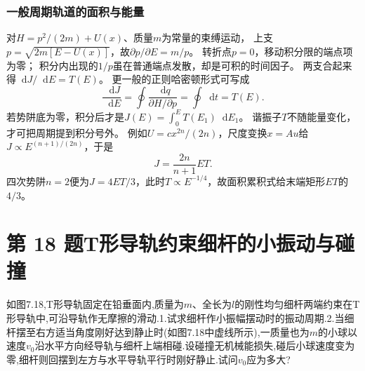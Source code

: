\documentclass[UTF8,fontset=fandol,a4paper,11pt]{ctexart}
\newcommand{\dd}{\mathop{}\!\mathrm{d}}
\newcommand{\tagline}[1]{\noindent{\small\color{muted}#1}\par}
\newcommand{\figcaption}[1]{\par\vspace{2pt}{\small\color{muted}#1}\par}
\begin{document}
\subsubsection*{一般周期轨道的面积与能量}
对$H=p^2/(2m)+U(x)$、质量$m$为常量的束缚运动，
上支$p=\sqrt{2m[E-U(x)]}$，故$\partial p/\partial E=m/p$。
转折点$p=0$，移动积分限的端点项为零；
积分内出现的$1/p$虽在普通端点发散，却是可积的时间因子。
两支合起来得$\dd J/\dd E=T(E)$。
更一般的正则哈密顿形式可写成
\[
\frac{\dd J}{\dd E}=\oint\frac{\dd q}{\partial H/\partial p}
=\oint\dd t=T(E).
\]
若势阱底为零，积分后才是$J(E)=\int_0^E T(E_1)\dd E_1$。
谐振子$T$不随能量变化，才可把周期提到积分号外。
例如$U=cx^{2n}/(2n)$，尺度变换$x=A u$给
$J\propto E^{(n+1)/(2n)}$，于是
\[
J=\frac{2n}{n+1}ET.
\]
四次势阱$n=2$便为$J=4ET/3$，此时$T\propto E^{-1/4}$，故面积累积式给末端矩形$ET$的$4/3$。




\section*{第 18 题\quad T形导轨约束细杆的小振动与碰撞}

\tagline{M-07-18}

如图7.18,T形导轨固定在铅垂面内,质量为\(m\)、全长为\(l\)的刚性均匀细杆两端约束在T形导轨中,可沿导轨作无摩擦的滑动.1.试求细杆作小振幅摆动时的振动周期.2.当细杆摆至右方适当角度刚好达到静止时(如图7.18中虚线所示),一质量也为\(m\)的小球以速度\(v_{0}\)沿水平方向经导轨与细杆上端相碰.设碰撞无机械能损失,碰后小球速度变为零,细杆则回摆到左方与水平导轨平行时刚好静止.试问\(v_{0}\)应为多大?

\begin{center}\begin{minipage}{\linewidth}\centering{}\figcaption{图 7.18}\end{minipage}\end{center}
\end{document}
